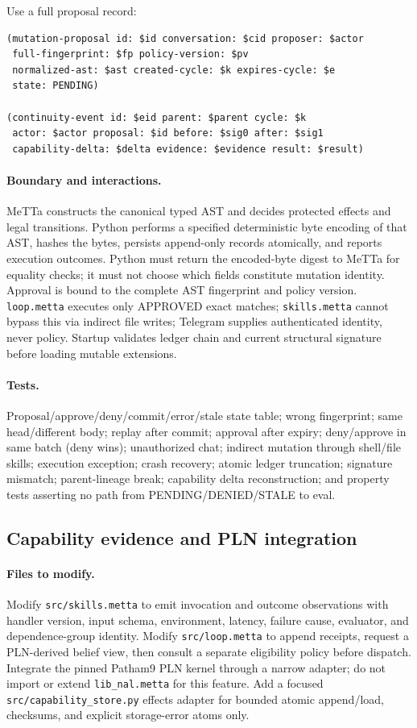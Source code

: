 \documentclass[11pt]{article}
\begin{document}
Use a full proposal record:
\begin{lstlisting}
(mutation-proposal id: $id conversation: $cid proposer: $actor
 full-fingerprint: $fp policy-version: $pv
 normalized-ast: $ast created-cycle: $k expires-cycle: $e
 state: PENDING)

(continuity-event id: $eid parent: $parent cycle: $k
 actor: $actor proposal: $id before: $sig0 after: $sig1
 capability-delta: $delta evidence: $evidence result: $result)
\end{lstlisting}

\paragraph{Boundary and interactions.}
MeTTa constructs the canonical typed AST and decides protected effects and legal
transitions.  Python performs a specified deterministic byte encoding of that AST,
hashes the bytes, persists append-only records atomically, and reports execution
outcomes.  Python must return the encoded-byte digest to MeTTa for equality checks;
it must not choose which fields constitute mutation identity.  Approval is bound
to the complete AST fingerprint and policy version.
\texttt{loop.metta} executes only APPROVED exact matches; \texttt{skills.metta}
cannot bypass this via indirect file writes; Telegram supplies authenticated
identity, never policy.  Startup validates ledger chain and current structural
signature before loading mutable extensions.

\paragraph{Tests.}
Proposal/approve/deny/commit/error/stale state table; wrong fingerprint; same
head/different body; replay after commit; approval after expiry; deny/approve in
same batch (deny wins); unauthorized chat; indirect mutation through shell/file
skills; execution exception; crash recovery; atomic ledger truncation; signature
mismatch; parent-lineage break; capability delta reconstruction; and property
tests asserting no path from PENDING/DENIED/STALE to eval.

\subsection{Capability evidence and PLN integration}

\paragraph{Files to modify.}
Modify \texttt{src/skills.metta} to emit invocation and outcome observations with
handler version, input schema, environment, latency, failure cause, evaluator,
and dependence-group identity.  Modify \texttt{src/loop.metta} to append receipts,
request a PLN-derived belief view, then consult a separate eligibility policy
before dispatch.  Integrate the pinned Patham9 PLN kernel through a narrow adapter;
do not import or extend \texttt{lib\_nal.metta} for this feature.  Add a focused
\texttt{src/capability\_store.py} effects adapter for bounded atomic append/load,
checksums, and explicit storage-error atoms only.
\end{document}
